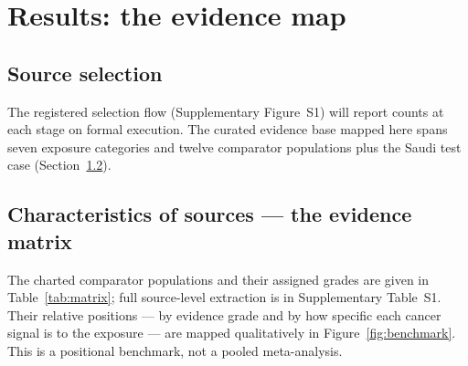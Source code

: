 \documentclass[3p,times]{elsarticle}
\begin{document}
\section{Results: the evidence map}

\subsection{Source selection}
The registered selection flow (Supplementary Figure~S1) will report counts at each stage on formal execution. The curated evidence base mapped here spans seven exposure categories and twelve comparator populations plus the Saudi test case (Section~\ref{sec:matrix}).

\subsection{Characteristics of sources --- the evidence matrix}\label{sec:matrix}
The charted comparator populations and their assigned grades are given in Table~\ref{tab:matrix}; full source-level extraction is in Supplementary Table~S1. Their relative positions --- by evidence grade and by how specific each cancer signal is to the exposure --- are mapped qualitatively in Figure~\ref{fig:benchmark}. This is a positional benchmark, not a pooled meta-analysis.
\end{document}
